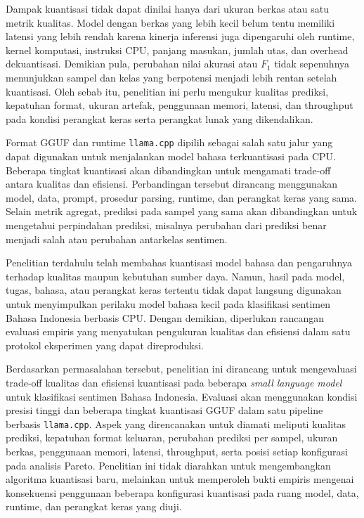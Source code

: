 Dampak kuantisasi tidak dapat dinilai hanya dari ukuran berkas atau satu metrik kualitas. Model dengan berkas yang lebih kecil belum tentu memiliki latensi yang lebih rendah karena kinerja inferensi juga dipengaruhi oleh runtime, kernel komputasi, instruksi CPU, panjang masukan, jumlah utas, dan overhead dekuantisasi. Demikian pula, perubahan nilai akurasi atau $F_1$ tidak sepenuhnya menunjukkan sampel dan kelas yang berpotensi menjadi lebih rentan setelah kuantisasi. Oleh sebab itu, penelitian ini perlu mengukur kualitas prediksi, kepatuhan format, ukuran artefak, penggunaan memori, latensi, dan throughput pada kondisi perangkat keras serta perangkat lunak yang dikendalikan.

Format GGUF dan runtime \texttt{llama.cpp} dipilih sebagai salah satu jalur yang dapat digunakan untuk menjalankan model bahasa terkuantisasi pada CPU. Beberapa tingkat kuantisasi akan dibandingkan untuk mengamati trade-off antara kualitas dan efisiensi. Perbandingan tersebut dirancang menggunakan model, data, prompt, prosedur parsing, runtime, dan perangkat keras yang sama. Selain metrik agregat, prediksi pada sampel yang sama akan dibandingkan untuk mengetahui perpindahan prediksi, misalnya perubahan dari prediksi benar menjadi salah atau perubahan antarkelas sentimen.

Penelitian terdahulu telah membahas kuantisasi model bahasa dan pengaruhnya terhadap kualitas maupun kebutuhan sumber daya. Namun, hasil pada model, tugas, bahasa, atau perangkat keras tertentu tidak dapat langsung digunakan untuk menyimpulkan perilaku model bahasa kecil pada klasifikasi sentimen Bahasa Indonesia berbasis CPU. Dengan demikian, diperlukan rancangan evaluasi empiris yang menyatukan pengukuran kualitas dan efisiensi dalam satu protokol eksperimen yang dapat direproduksi.

Berdasarkan permasalahan tersebut, penelitian ini dirancang untuk mengevaluasi trade-off kualitas dan efisiensi kuantisasi pada beberapa \textit{small language model} untuk klasifikasi sentimen Bahasa Indonesia. Evaluasi akan menggunakan kondisi presisi tinggi dan beberapa tingkat kuantisasi GGUF dalam satu pipeline berbasis \texttt{llama.cpp}. Aspek yang direncanakan untuk diamati meliputi kualitas prediksi, kepatuhan format keluaran, perubahan prediksi per sampel, ukuran berkas, penggunaan memori, latensi, throughput, serta posisi setiap konfigurasi pada analisis Pareto. Penelitian ini tidak diarahkan untuk mengembangkan algoritma kuantisasi baru, melainkan untuk memperoleh bukti empiris mengenai konsekuensi penggunaan beberapa konfigurasi kuantisasi pada ruang model, data, runtime, dan perangkat keras yang diuji.

